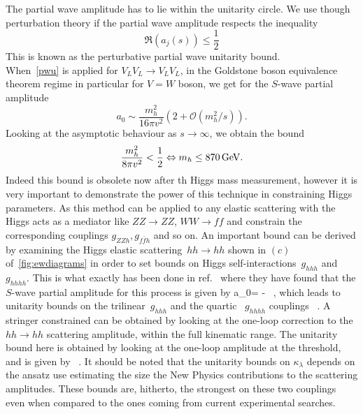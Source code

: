 The partial wave amplitude has to lie within the unitarity circle. We use though perturbation theory if the  partial wave amplitude respects the inequality
\begin{equation}
	\mathfrak{R} (a_j(s)) \leq \frac{1}{2}
	\label{pwu}
\end{equation}
This is known as the perturbative partial wave unitarity bound.  \\
When~\eqref{pwu} is applied for  $V_L V_L \to V_L V_L$, in the Goldstone boson equivalence theorem regime in particular for $V=W$ boson, we get for the $S$-wave partial amplitude
\begin{equation}
	a_0 \sim \frac{m_h^2}{16 \pi  v^2} \left( 2+\mathcal{O} \left(m_h^2/s \right) \right) .
\end{equation}
Looking at the asymptotic behaviour as $ s \to \infty$, we obtain the bound
\begin{equation}
	\frac{m_h^2}{8 \pi v^2} < {1\over 2}  \Leftrightarrow  m_h \leq 870 \,\GeV.
\end{equation}
Indeed this bound is obsolete now after th Higgs mass measurement, however it is very important to demonstrate the power of this technique in constraining Higgs parameters. As this method can be applied to any elastic scattering with the Higgs acts as a mediator like $ZZ\to ZZ$, $WW \to ff$ and constrain the corresponding couplings $ g_{ZZh}, g_{f\bar f h}$ and so on. An important bound can be derived by examining the Higgs elastic scattering~$hh \to hh$ shown in $(c)$ of~\autoref{fig:ewdiagrams} in order to set bounds on Higgs self-interactions~$g_{hhh}$ and $g_{hhhh}$. This is what exactly has been done in ref.~\cite{DiLuzio:2017tfn}  where they have found that the $S$-wave partial amplitude for this process is given by
\beq 
\label{a0hhtohh}
a_0= -    \, ,
\eeq
which leads to unitarity bounds on the trilinear~$g_{hhh}$ and the quartic ~$g_{hhhh}$ couplings 
\beq
\label{unitaritybounds}
  
\qquad {} \qquad
{}  \, .
\eeq
A stringer constrained can be obtained by looking at the one-loop correction to the $hh\to hh$ scattering amplitude, within the full kinematic range.
The unitarity bound here is obtained by looking at the one-loop  amplitude at the threshold, and is given by
\beq 
\label{pertboundhhhmax}
  \, .
\eeq
It should be noted that the unitarity bounds on $\kappa_\lambda$ depends on the ansatz use estimating the size the New Physics contributions to the scattering amplitudes.
These bounds are, hitherto, the strongest on these two couplings even when compared to the ones coming from current experimental searches. 
